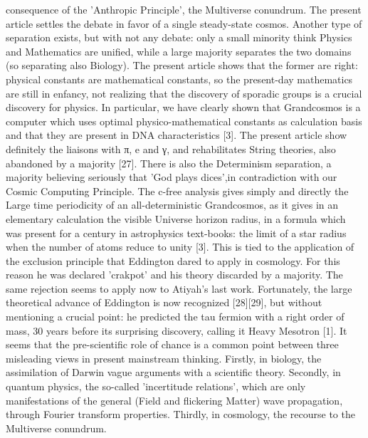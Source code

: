 consequence of the 'Anthropic Principle', the Multiverse conundrum. The present article settles the
debate in favor of a single steady-state cosmos.
Another type of separation exists, but with not any debate: only a small minority think Physics
and Mathematics are unified, while a large majority separates the two domains (so separating also
Biology). The present article shows that the former are right: physical constants are mathematical
constants, so the present-day mathematics are still in enfancy, not realizing that the discovery of
sporadic groups is a crucial discovery for physics. In particular, we have clearly shown that
Grandcosmos is a computer which uses optimal physico-mathematical constants as calculation basis
and that they are present in DNA characteristics [3]. The present article show definitely the liaisons
with π, e and γ, and rehabilitates String theories, also abandoned by a majority [27].
There is also the Determinism separation, a majority believing seriously that 'God plays dices',in contradiction with our Cosmic Computing Principle. The c-free analysis gives simply and
directly the Large time periodicity of an all-deterministic Grandcosmos, as it gives in an elementary
calculation the visible Universe horizon radius, in a formula which was present for a century in
astrophysics text-books: the limit of a star radius when the number of atoms reduce to unity [3].
This is tied to the application of the exclusion principle that Eddington dared to apply in cosmology.
For this reason he was declared 'crakpot' and his theory discarded by a majority. The same rejection
seems to apply now to Atiyah's last work. Fortunately, the large theoretical advance of Eddington is
now recognized [28][29], but without mentioning a crucial point: he predicted the tau fermion with
a right order of mass, 30 years before its surprising discovery, calling it Heavy Mesotron [1].
It seems that the pre-scientific role of chance is a common point between three misleading views
in present mainstream thinking. Firstly, in biology, the assimilation of Darwin vague arguments
with a scientific theory. Secondly, in quantum physics, the so-called 'incertitude relations', which are
only manifestations of the general (Field and flickering Matter) wave propagation, through Fourier
transform properties. Thirdly, in cosmology, the recourse to the Multiverse conundrum.
